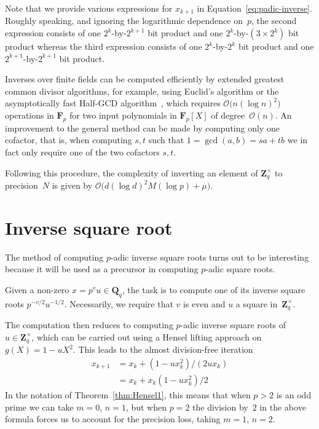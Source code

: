 Note that we provide various expressions for $x_{k+1}$ in 
Equation~\eqref{eq:padic-inverse}.  Roughly speaking, and ignoring 
the logarithmic dependence on~$p$, the second expression consists of 
one $2^k$-by-$2^{k+1}$ bit product and one $2^k$-by-$(3 \times 2^k)$ bit 
product whereas the third expression consists of one $2^k$-by-$2^k$ bit 
product and one $2^{k+1}$-by-$2^{k+1}$ bit product.

Inverses over finite fields can be computed efficiently by 
extended greatest common divisor algorithms, for example, using 
Euclid's algorithm or the asymptotically fast Half-GCD 
algorithm~\citep{ThullYap1990}, which requires 
$\mathcal{O}\bigl(n (\log n)^2\bigr)$ operations in $\mathbf{F}_p$ 
for two input polynomials in $\mathbf{F}_p[X]$ of degree~$\mathcal{O}(n)$.  
An improvement to the general method can be made by computing only one 
cofactor, that is, when computing $s, t$ such that $1 = \gcd(a,b) = sa + tb$ 
we in fact only require one of the two cofactors $s, t$.

Following this procedure, the complexity of inverting an element of 
$\mathbf{Z}_q^{\times}$ to precision~$N$ is given by 
$\mathcal{O}\bigl( d (\log d)^2 M(\log p) + \mu \bigr)$.

\section{Inverse square root}

The method of computing $p$-adic inverse square roots turns out 
to be interesting because it will be used as a precursor in computing 
$p$-adic square roots.

Given a non-zero $x = p^v u \in \mathbf{Q}_q$, the task is to compute 
one of its inverse square roots $p^{-v/2} u^{-1/2}$.  Necessarily, 
we require that $v$ is even and $u$ a square in~$\mathbf{Z}_q^{\times}$.

The computation then reduces to computing $p$-adic inverse square 
roots of $u \in \mathbf{Z}_q^{\times}$, which can be carried out 
using a Hensel lifting approach on $g(X) = 1 - u X^2$.  This leads 
to the almost division-free iteration
\begin{equation}
\begin{split}
x_{k+1} & = x_k + (1 - u x_k^2) / (2 u x_k) \\
        & = x_k + x_k (1 - u x_k^2) / 2
\end{split}
\end{equation}
In the notation of Theorem~\ref{thm:Hensel1}, this means that when 
$p > 2$ is an odd prime we can take $m = 0$, $n = 1$, but when $p = 2$ 
the division by~$2$ in the above formula forces us to account for 
the precision loss, taking $m = 1$, $n = 2$.

